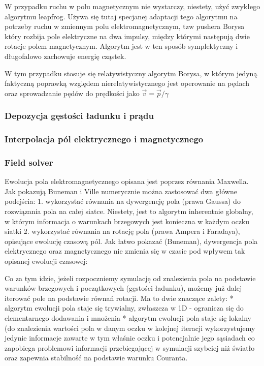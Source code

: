 W przypadku ruchu w polu magnetycznym nie wystarczy, niestety, użyć zwykłego algorytmu leapfrog. %
Używa się tutaj specjanej adaptacji tego algorytmu na potrzeby ruchu w zmiennym polu elektromagnetycznym,
tzw pushera %
Borysa %
który rozbija pole elektryczne na dwa impulsy, między którymi następują dwie %
rotacje polem magnetycznym. Algorytm jest w ten sposób symplektyczny %
i długofalowo zachowuje energię cząstek.

W tym przypadku stosuje się relatywistyczny algorytm Borysa, w którym jedyną faktyczną poprawką względem
nierelatywistycznego jest operowanie na pędach oraz sprowadzanie pędów do prędkości jako $\vec{v} = \vec{p} / \gamma$ %

\subsubsection{Depozycja gęstości ładunku i prądu}
\subsubsection{Interpolacja pól elektrycznego i magnetycznego}
\subsubsection{Field solver} %

Ewolucja pola elektromagnetycznego opisana jest poprzez równania Maxwella. Jak pokazują Buneman i Ville %
numerycznie można zastosować dwa główne podejścia: %
1. wykorzystać równania na dywergencję pola (prawa Gaussa) do rozwiązania pola na całej siatce. Niestety, jest to
algorytm inherentnie globalny, w którym informacja o warunkach brzegowych jest konieczna w każdym oczku siatki
2. wykorzystać równania na rotację pola (prawa Ampera i Faradaya), opisujące ewolucję czasową pól. Jak łatwo pokazać (Buneman),
dywergencja pola elektrycznego oraz magnetycznego nie zmienia się w czasie pod wpływem tak opisanej ewolucji czasowej:

Co za tym idzie, jeżeli rozpoczniemy symulację od znalezienia pola na podstawie warunków brzegowych i początkowych (gęstości
ładunku), możemy już dalej iterować pole na podstawie równań rotacji. Ma to dwie znaczące zalety:
* algorytm ewolucji pola staje się trywialny, zwłaszcza w 1D - ogranicza się do elementarnego dodawania i mnożenia %
* algorytm ewolucji pola staje się lokalny (do znalezienia wartości pola w danym oczku w kolejnej iteracji wykorzystujemy
jedynie informacje zawarte w tym właśnie oczku i potencjalnie jego sąsiadach %
co zapobiega problemowi informacji przebiegającej w symulacji szybciej niż światło oraz zapewnia stabilność na podstawie
warunku Couranta.

